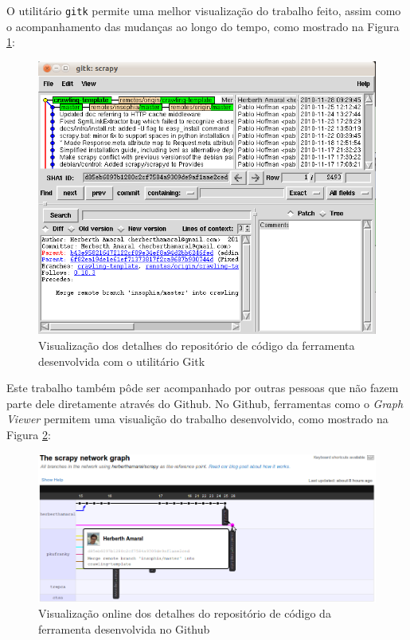 O utilitário \texttt{gitk} permite uma melhor visualização do trabalho feito, assim como o acompanhamento das mudanças ao longo do tempo, como mostrado na Figura \ref{gitk}:

\begin{figure} [ht]
	\begin{center}
		\includegraphics[scale=0.5]{gitk.png}
	\end{center}
	\caption{Visualização dos detalhes do repositório de código da ferramenta desenvolvida com o utilitário Gitk}
	\label{gitk}
\end{figure}

\pagebreak
Este trabalho também pôde ser acompanhado por outras pessoas que não fazem parte dele diretamente através do Github. No Github, ferramentas como o \emph{Graph Viewer} permitem uma visualição do trabalho desenvolvido, como mostrado na Figura \ref{github}:

\begin{figure} [ht]
	\begin{center}
		\includegraphics[scale=0.5]{github.png}	
	\end{center}
	\caption{Visualização online dos detalhes do repositório de código da ferramenta desenvolvida no Github}
	\label{github}
\end{figure}

